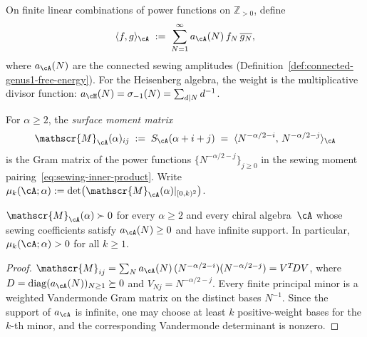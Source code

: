 \begin{definition}%
\label{def:sewing-inner-product}%
%
%
On finite linear combinations of power functions on $\mathbb Z_{>0}$,
define
\begin{equation}\label{eq:sewing-inner-product}
\langle f, g \rangle_\cA
\;:=\;
\sum_{N=1}^\infty
a_\cA(N)\,f_N\,\overline{g_N},
\end{equation}
where $a_\cA(N)$ are the connected sewing amplitudes
(Definition~\ref{def:connected-genus1-free-energy}).
For the Heisenberg algebra, the weight is the
multiplicative divisor function:
$a_\cH(N) = \sigma_{-1}(N) = \sum_{d \mid N}d^{-1}$.
\end{definition}

\begin{definition}%
\label{def:surface-moment-matrix}%
%
For $\alpha \geq 2$, the \emph{surface moment matrix}
\begin{equation}\label{eq:surface-moment-matrix}
\mathscr{M}_\cA(\alpha)_{ij}
\;:=\; S_\cA(\alpha + i + j)
\;=\;
\langle N^{-\alpha/2-i},\, N^{-\alpha/2-j}\rangle_\cA
\end{equation}
is the Gram matrix of the power functions
$\{N^{-\alpha/2-j}\}_{j \geq 0}$
in the sewing moment pairing~\eqref{eq:sewing-inner-product}.
Write $\mu_k(\cA;\alpha) :=
\det\bigl(\mathscr{M}_\cA(\alpha)|_{[0,k)^2}\bigr)$.
\end{definition}

\begin{theorem}%
\label{thm:surface-moment-positivity}%
\label{thm:gram-positivity}%
%
%
$\mathscr{M}_\cA(\alpha) \succ 0$
for every $\alpha \geq 2$ and every chiral algebra~$\cA$
whose sewing coefficients satisfy $a_\cA(N) \geq 0$ and have infinite
support.
In particular, $\mu_k(\cA;\alpha) > 0$ for all $k \geq 1$.
\end{theorem}

\begin{proof}
$\mathscr{M}_{ij} = \sum_N a_\cA(N)\,(N^{-\alpha/2-i})(N^{-\alpha/2-j})
= V^T\!DV$,
where $D = \operatorname{diag}(a_\cA(N))_{N \geq 1} \succeq 0$
and $V_{Nj} = N^{-\alpha/2-j}$.
Every finite principal minor is a weighted Vandermonde Gram matrix on
the distinct bases $N^{-1}$. Since the support of $a_\cA$ is infinite,
one may choose at least $k$ positive-weight bases for the $k$-th minor,
and the corresponding Vandermonde determinant is nonzero.
\end{proof}

